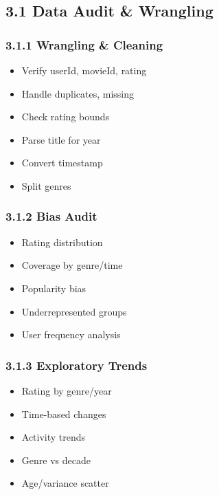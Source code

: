 \documentclass[
]{article}
\providecommand{\tightlist}{%
  \setlength{\itemsep}{0pt}\setlength{\parskip}{0pt}}
\begin{document}
\subsection{3.1 Data Audit \& Wrangling}\label{data-audit-wrangling}

\newpage

\subsubsection{3.1.1 Wrangling \& Cleaning}\label{wrangling-cleaning}

\begin{itemize}
\tightlist
\item
  Verify userId, movieId, rating\\
\item
  Handle duplicates, missing\\
\item
  Check rating bounds\\
\item
  Parse title for year\\
\item
  Convert timestamp\\
\item
  Split genres \newpage
\end{itemize}

\subsubsection{3.1.2 Bias Audit}\label{bias-audit}

\begin{itemize}
\tightlist
\item
  Rating distribution\\
\item
  Coverage by genre/time\\
\item
  Popularity bias\\
\item
  Underrepresented groups\\
\item
  User frequency analysis \newpage
\end{itemize}

\subsubsection{3.1.3 Exploratory Trends}\label{exploratory-trends}

\begin{itemize}
\tightlist
\item
  Rating by genre/year\\
\item
  Time-based changes\\
\item
  Activity trends\\
\item
  Genre vs decade\\
\item
  Age/variance scatter \newpage
\end{itemize}
\end{document}
